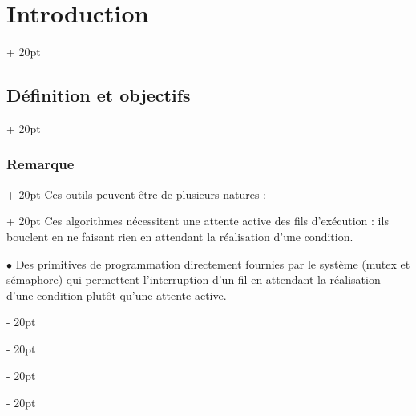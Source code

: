 \documentclass[a4paper, 12pt, twoside]{article}
\newcommand{\ind}[1][20pt]{\advance\leftskip + #1}
\newcommand{\deind}[1][20pt]{\advance\leftskip - #1}
\newenvironment{indt}[2][20pt]{#2 \par \ind[#1]}{\par \deind} %
\begin{document}
\begin{indt}{\section{Introduction}}
\begin{indt}{\subsection{Définition et objectifs}}
\begin{indt}{\subsubsection{Remarque}}
\begin{indt}{Ces outils peuvent être de plusieurs natures :}
                    Ces algorithmes nécessitent une attente active des fils d'exécution : ils bouclent en ne faisant rien en attendant la réalisation d'une condition.

                    $\bullet$ Des primitives de programmation directement fournies par le système (mutex et sémaphore) qui permettent l'interruption d'un fil en attendant la réalisation d'une condition plutôt qu'une attente active.
                \end{indt}
            \end{indt}
        \end{indt}
    \end{indt}
    
    
    
\end{document}
